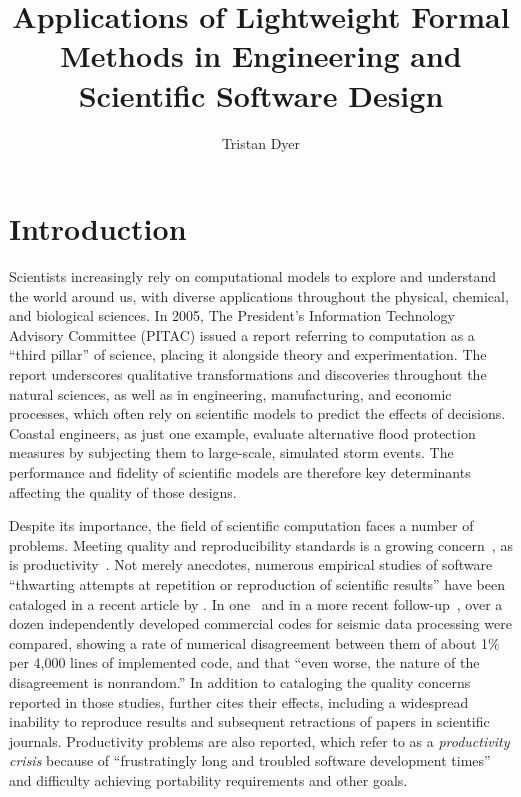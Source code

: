 \documentclass[12pt]{article}
\begin{document}
\title{Applications of Lightweight Formal Methods in Engineering and Scientific Software Design}
\author{Tristan Dyer}
\maketitle

\section{Introduction}

Scientists increasingly rely on computational models to explore and
understand the world around us, with diverse applications throughout
the physical, chemical, and biological sciences.  In 2005, The
President's Information Technology Advisory Committee (PITAC) issued a
report referring to computation as a ``third pillar'' of science,
placing it alongside theory and experimentation.  The report
underscores qualitative transformations and discoveries throughout the
natural sciences, as well as in engineering, manufacturing, and
economic processes, which often rely on scientific models to predict
the effects of decisions.  Coastal engineers, as just one example,
evaluate alternative flood protection measures by subjecting them to
large-scale, simulated storm events.  The performance and fidelity of
scientific models are therefore key determinants affecting the quality
of those designs.

Despite its importance, the field of scientific computation faces a
number of problems.  Meeting quality and reproducibility standards is
a growing concern~\citep{wilson2006}, as is
productivity~\citep{faulk2009}.  Not merely anecdotes, numerous
empirical studies of software ``thwarting attempts at repetition or
reproduction of scientific results'' have been cataloged in a recent
article by \cite{storer2017}.  In one~\citep{hatton1994} and in a more
recent follow-up~\citep{hatton2007}, over a dozen independently
developed commercial codes for seismic data processing were compared,
showing a rate of numerical disagreement between them of about 1\% per
4,000 lines of implemented code, and that ``even worse, the nature of
the disagreement is nonrandom.''  In addition to cataloging the
quality concerns reported in those studies, \cite{storer2017} further
cites their effects, including a widespread inability to reproduce
results and subsequent retractions of papers in scientific journals.
Productivity problems are also reported, which \cite{faulk2009} refer
to as a \emph{productivity crisis} because of ``frustratingly long and
troubled software development times'' and difficulty achieving
portability requirements and other goals.
\end{document}
